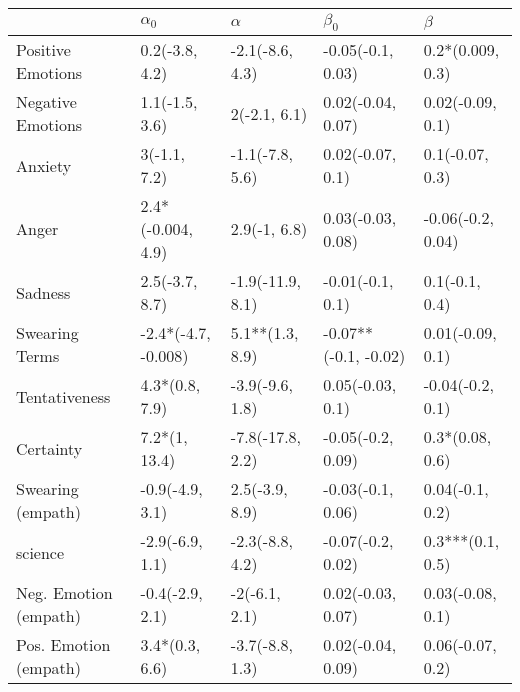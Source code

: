 \begin{tabular}{lllll}
\toprule
{} &           $\alpha_0$ &          $\alpha$ &             $\beta_0$ &            $\beta$ \\
\midrule
Positive Emotions     &       0.2(-3.8, 4.2) &   -2.1(-8.6, 4.3) &     -0.05(-0.1, 0.03) &   0.2*(0.009, 0.3) \\
Negative Emotions     &       1.1(-1.5, 3.6) &      2(-2.1, 6.1) &     0.02(-0.04, 0.07) &   0.02(-0.09, 0.1) \\
Anxiety               &         3(-1.1, 7.2) &   -1.1(-7.8, 5.6) &      0.02(-0.07, 0.1) &    0.1(-0.07, 0.3) \\
Anger                 &    2.4*(-0.004, 4.9) &      2.9(-1, 6.8) &     0.03(-0.03, 0.08) &  -0.06(-0.2, 0.04) \\
Sadness               &       2.5(-3.7, 8.7) &  -1.9(-11.9, 8.1) &      -0.01(-0.1, 0.1) &     0.1(-0.1, 0.4) \\
Swearing Terms        &  -2.4*(-4.7, -0.008) &   5.1**(1.3, 8.9) &  -0.07**(-0.1, -0.02) &   0.01(-0.09, 0.1) \\
Tentativeness         &       4.3*(0.8, 7.9) &   -3.9(-9.6, 1.8) &      0.05(-0.03, 0.1) &   -0.04(-0.2, 0.1) \\
Certainty             &        7.2*(1, 13.4) &  -7.8(-17.8, 2.2) &     -0.05(-0.2, 0.09) &    0.3*(0.08, 0.6) \\
Swearing (empath)     &      -0.9(-4.9, 3.1) &    2.5(-3.9, 8.9) &     -0.03(-0.1, 0.06) &    0.04(-0.1, 0.2) \\
science               &      -2.9(-6.9, 1.1) &   -2.3(-8.8, 4.2) &     -0.07(-0.2, 0.02) &   0.3***(0.1, 0.5) \\
Neg. Emotion (empath) &      -0.4(-2.9, 2.1) &     -2(-6.1, 2.1) &     0.02(-0.03, 0.07) &   0.03(-0.08, 0.1) \\
Pos. Emotion (empath) &       3.4*(0.3, 6.6) &   -3.7(-8.8, 1.3) &     0.02(-0.04, 0.09) &   0.06(-0.07, 0.2) \\
\bottomrule
\end{tabular}

